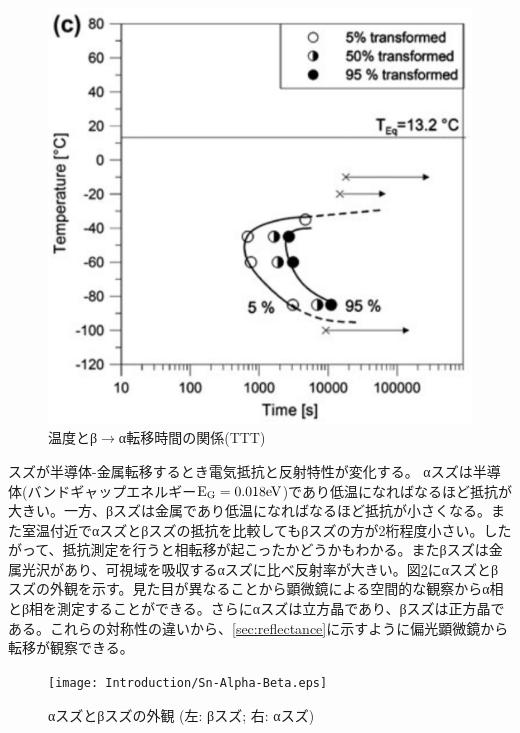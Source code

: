 \begin{figure}[!h]
\begin{minipage}{0.5\hsize}
\begin{center}
   \includegraphics[width=\hsize]{Introduction/TTT.eps}
  \end{center}
  \caption{温度とβ$\to$α転移時間の関係(TTT)\cite{Nogita}}
  \label{fig:TTT}
  \end{minipage}
\end{figure}

スズが半導体-金属転移するとき電気抵抗と反射特性が変化する。
αスズは半導体(バンドギャップエネルギー$\rm E_G=0.018eV$)であり低温になればなるほど抵抗が大きい。一方、βスズは金属であり低温になればなるほど抵抗が小さくなる。また室温付近でαスズとβスズの抵抗を比較してもβスズの方が2桁程度小さい。したがって、抵抗測定を行うと相転移が起こったかどうかもわかる。またβスズは金属光沢があり、可視域を吸収するαスズに比べ反射率が大きい。図\ref{fig:Sn-Alpha-Beta}にαスズとβスズの外観を示す\cite{wiki}。見た目が異なることから顕微鏡による空間的な観察からα相とβ相を測定することができる。さらにαスズは立方晶であり、βスズは正方晶である。これらの対称性の違いから、\ref{sec:reflectance}に示すように偏光顕微鏡から転移が観察できる\cite{Matvienko}。
\begin{figure}[!h]
    \begin{center}
   \texttt{[image: Introduction/Sn-Alpha-Beta.eps]}
  \end{center}
  \caption{αスズとβスズの外観 (左: βスズ; 右: αスズ)\cite{wiki}}
  \label{fig:Sn-Alpha-Beta}
\end{figure}

